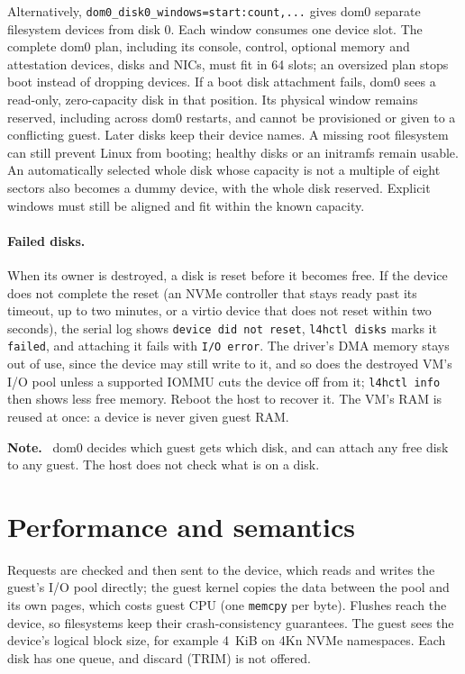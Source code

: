 \documentclass[11pt,a4paper]{report}
\newcommand{\cmd}[1]{\texttt{#1}}
\newenvironment{caveat}{\par\medskip\noindent\color{note}\textbf{Note.}\ }{\par\medskip}
\begin{document}
Alternatively, \texttt{dom0\_disk0\_windows=start:count,...} gives dom0
separate filesystem devices from disk 0. Each window consumes one device
slot. The complete dom0 plan, including its console, control, optional
memory and attestation devices, disks and NICs, must fit in 64 slots;
an oversized plan stops boot instead of dropping devices.
If a boot disk attachment fails, dom0 sees a read-only, zero-capacity disk
in that position. Its physical window remains reserved, including across
dom0 restarts, and cannot be provisioned or given to a conflicting guest.
Later disks keep their device names. A missing root filesystem can still
prevent Linux from booting; healthy disks or an initramfs remain usable.
An automatically selected whole disk whose capacity is not a multiple of
eight sectors also becomes a dummy device, with the whole disk reserved.
Explicit windows must still be aligned and fit within the known capacity.

\paragraph{Failed disks.}\label{sec:disk-failed} When its owner is
destroyed, a disk is reset before it becomes free. If the device does not
complete the reset (an NVMe controller that stays ready past its timeout,
up to two minutes, or a virtio device that does not reset within two
seconds), the serial log shows \texttt{device did not reset}, \cmd{l4hctl
disks} marks it \texttt{failed}, and attaching it fails with \texttt{I/O
error}. The driver's DMA memory stays out of use, since the device may still
write to it, and so does the destroyed VM's I/O pool unless a supported IOMMU cuts
the device off from it; \cmd{l4hctl info} then shows less free memory.
Reboot the host to recover it. The VM's RAM is reused
at once: a device is never given guest RAM.

\begin{caveat}
dom0 decides which guest gets which disk, and can attach any free disk to
any guest. The host does not check what is on a disk.
\end{caveat}

\section{Performance and semantics}

Requests are checked and then sent to the device, which reads and writes
the guest's I/O pool directly; the guest kernel copies the data between the
pool and its own pages, which costs guest CPU (one \texttt{memcpy} per
byte). Flushes reach the device, so filesystems keep their
crash-consistency guarantees. The guest sees the device's logical block
size, for example 4~KiB on 4Kn NVMe namespaces. Each disk has one queue, and
discard (TRIM) is not offered.
\end{document}
